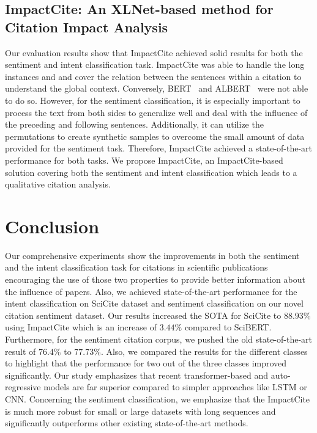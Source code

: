 \documentclass[runningheads]{llncs}
\begin{document}
\subsection{ImpactCite: An XLNet-based method for Citation Impact Analysis}
Our evaluation results show that ImpactCite achieved solid results for both the sentiment and intent classification task. ImpactCite was able to handle the long instances and and cover the relation between the sentences within a citation to understand the global context. Conversely, BERT~\cite{devlin2018bert} and ALBERT~\cite{lan2019albert} were not able to do so. However, for the sentiment classification, it is especially important to process the text from both sides to generalize well and deal with the influence of the preceding and following sentences. Additionally, it can utilize the permutations to create synthetic samples to overcome the small amount of data provided for the sentiment task. Therefore, ImpactCite achieved a state-of-the-art performance for both tasks. We propose ImpactCite, an ImpactCite-based solution covering both the sentiment and intent classification which leads to a qualitative citation analysis.


\section{Conclusion}
Our comprehensive experiments show the improvements in both the sentiment and the intent classification task for citations in scientific publications encouraging the use of those two properties to provide better information about the influence of papers. Also, we achieved state-of-the-art performance for the intent classification on SciCite \cite{cohan2019structural} dataset and sentiment classification on our novel citation sentiment dataset. Our results increased the SOTA for SciCite to $88.93\%$ using ImpactCite which is an increase of $3.44\%$ compared to SciBERT. Furthermore, for the sentiment citation corpus, we pushed the old state-of-the-art result of $76.4\%$ to $77.73\%$. Also, we compared the results for the different classes to highlight that the performance for two out of the three classes improved significantly. Our study emphasizes that recent transformer-based and auto-regressive models are far superior compared to simpler approaches like LSTM or CNN. Concerning the sentiment classification, we emphasize that the ImpactCite is much more robust for small or large datasets with long sequences and significantly outperforms other existing state-of-the-art methods. 

 
\end{document}
